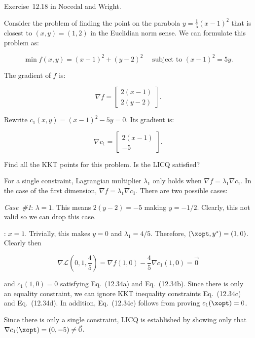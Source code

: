 \begin{problem}\label{prob:05}%
  Exercise~12.18 in Nocedal and Wright.
  
  Consider the problem of finding the point on the parabola $y=\frac{1}{5}(x-1)^{2}$ that is closest to $(x,y)=(1,2)$ in the Euclidian norm sense.  We can formulate this problem as:
  
  \[\min f(x,y)=(x-1)^2  + (y-2)^2 ~~~~~~ \text{subject to } (x-1)^2 = 5y \text{.} \]
\end{problem}

The gradient of $f$ is:

\[\nabla f =  \begin{bmatrix}
                2(x-1)\\
                2(y-2)
              \end{bmatrix} \text{.}\]

\noindent
Rewrite $c_1(x,y)=(x-1)^2-5y=0$.  Its gradient is:

\[\nabla c_1 =  \begin{bmatrix}
                  2(x-1)\\
                  -5
                \end{bmatrix} \text{.}\]

\begin{subproblem}
  Find all the KKT points for this problem.  Is the LICQ satisfied?
\end{subproblem}

For a single constraint, Lagrangian multiplier $\lambda_1$ only holds when $\nabla f = \lambda_1 \nabla c_1$.  In the case of the first dimension, $\nabla f = \lambda_1 \nabla c_1$.  There are two possible cases:

\noindent
\textit{Case~\#1}: $\lambda=1$.  This means $2(y-2)=-5$ making $y=-1/2$.  Clearly, this not valid so we can drop this case.

\noindent
{}: $x=1$.  Trivially, this makes $y=0$ and $\lambda_1=4/5$.  Therefore, $(\xopt,y^{*})=(1,0)$.  Clearly then 

\[\nabla \mathcal{L}\left(0,1,\frac{4}{5}\right)=\nabla f(1,0)-\frac{4}{5} \nabla c_1(1,0) = \vec{0} \] 

\noindent
and $c_1(1,0)=0$ satisfying Eq.~(12.34a) and Eq.~(12.34b).  Since there is only an equality constraint, we can ignore KKT inequality constraints Eq.~(12.34c) and Eq.~(12.34d).  In addition, Eq.~(12.34e) follows from proving $c_1(\xopt)=0$.

Since there is only a single constraint, LICQ is established by showing only that $\nabla c_{1}(\xopt) = (0, -5) \ne \vec{0}$.  

